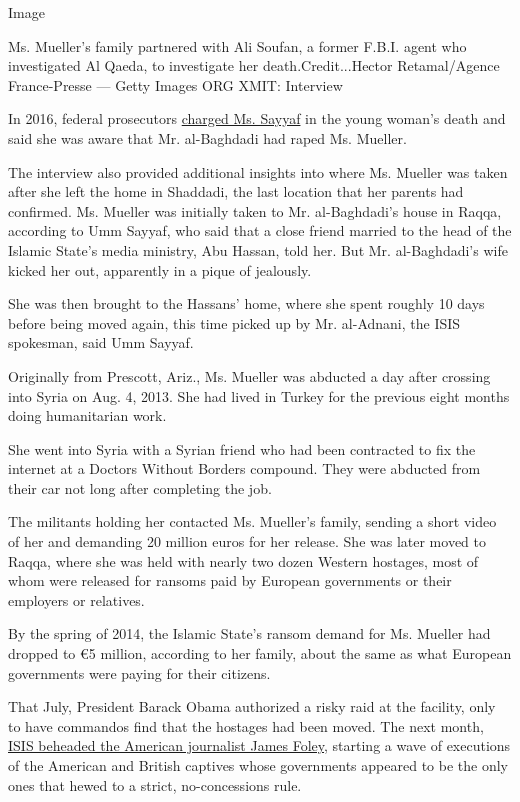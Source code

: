 Image

Ms. Mueller's family partnered with Ali Soufan, a former F.B.I. agent
who investigated Al Qaeda, to investigate her death.Credit...Hector
Retamal/Agence France-Presse --- Getty Images ORG XMIT: Interview

In 2016, federal prosecutors
\href{https://www.justice.gov/opa/pr/wife-dead-isil-leader-charged-death-kayla-jean-mueller}{charged
Ms. Sayyaf} in the young woman's death and said she was aware that Mr.
al-Baghdadi had raped Ms. Mueller.

The interview also provided additional insights into where Ms. Mueller
was taken after she left the home in Shaddadi, the last location that
her parents had confirmed. Ms. Mueller was initially taken to Mr.
al-Baghdadi's house in Raqqa, according to Umm Sayyaf, who said that a
close friend married to the head of the Islamic State's media ministry,
Abu Hassan, told her. But Mr. al-Baghdadi's wife kicked her out,
apparently in a pique of jealously.

She was then brought to the Hassans' home, where she spent roughly 10
days before being moved again, this time picked up by Mr. al-Adnani, the
ISIS spokesman, said Umm Sayyaf.

Originally from Prescott, Ariz., Ms. Mueller was abducted a day after
crossing into Syria on Aug. 4, 2013. She had lived in Turkey for the
previous eight months doing humanitarian work.

She went into Syria with a Syrian friend who had been contracted to fix
the internet at a Doctors Without Borders compound. They were abducted
from their car not long after completing the job.

The militants holding her contacted Ms. Mueller's family, sending a
short video of her and demanding 20 million euros for her release. She
was later moved to Raqqa, where she was held with nearly two dozen
Western hostages, most of whom were released for ransoms paid by
European governments or their employers or relatives.

By the spring of 2014, the Islamic State's ransom demand for Ms. Mueller
had dropped to €5 million, according to her family, about the same as
what European governments were paying for their citizens.

That July, President Barack Obama authorized a risky raid at the
facility, only to have commandos find that the hostages had been moved.
The next month,
\href{https://www.nytimes3xbfgragh.onion/2014/08/20/world/middleeast/isis-james-foley-syria-execution.html}{ISIS
beheaded the American journalist James Foley}, starting a wave of
executions of the American and British captives whose governments
appeared to be the only ones that hewed to a strict, no-concessions
rule.

